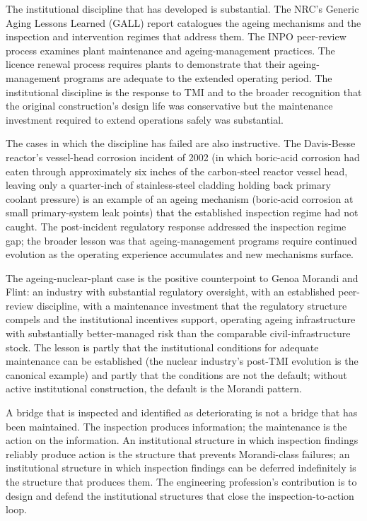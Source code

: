 The institutional discipline that has developed is substantial. The NRC's Generic Aging Lessons Learned (GALL) report catalogues the ageing mechanisms and the inspection and intervention regimes that address them. The INPO peer-review process examines plant maintenance and ageing-management practices. The licence renewal process requires plants to demonstrate that their ageing-management programs are adequate to the extended operating period. The institutional discipline is the response to TMI \cite{acc:kemeny-tmi-1979} and to the broader recognition that the original construction's design life was conservative but the maintenance investment required to extend operations safely was substantial.

The cases in which the discipline has failed are also instructive. The Davis-Besse reactor's vessel-head corrosion incident of 2002 (in which boric-acid corrosion had eaten through approximately six inches of the carbon-steel reactor vessel head, leaving only a quarter-inch of stainless-steel cladding holding back primary coolant pressure) is an example of an ageing mechanism (boric-acid corrosion at small primary-system leak points) that the established inspection regime had not caught. The post-incident regulatory response addressed the inspection regime gap; the broader lesson was that ageing-management programs require continued evolution as the operating experience accumulates and new mechanisms surface.

The ageing-nuclear-plant case is the positive counterpoint to Genoa Morandi and Flint: an industry with substantial regulatory oversight, with an established peer-review discipline, with a maintenance investment that the regulatory structure compels and the institutional incentives support, operating ageing infrastructure with substantially better-managed risk than the comparable civil-infrastructure stock. The lesson is partly that the institutional conditions for adequate maintenance can be established (the nuclear industry's post-TMI evolution is the canonical example) and partly that the conditions are not the default; without active institutional construction, the default is the Morandi pattern.

\begin{principle}
A bridge that is inspected and identified as deteriorating is not a bridge that has been maintained. The inspection produces information; the maintenance is the action on the information. An institutional structure in which inspection findings reliably produce action is the structure that prevents Morandi-class failures; an institutional structure in which inspection findings can be deferred indefinitely is the structure that produces them. The engineering profession's contribution is to design and defend the institutional structures that close the inspection-to-action loop.
\end{principle}


